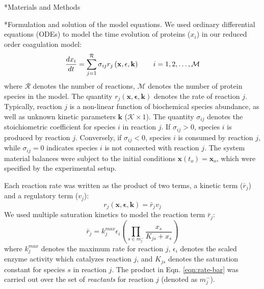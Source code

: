 \documentclass[12pt]{article}
\makeatletter
\renewcommand\subsection{\@startsection
	{subsection}{2}{0mm}
	{-0.05in}
	{-0.5\baselineskip}
	{\normalfont\normalsize\bfseries}}
\renewcommand\section{\@startsection
	{subsection}{2}{0mm}
	{-0.2in}
	{0.05\baselineskip}
	{\normalfont\large\bfseries}}
\makeatother
\begin{document}
\clearpage

\section*{Materials and Methods}

\subsection*{Formulation and solution of the model equations.}
We used ordinary differential equations (ODEs) to model the time evolution of proteins ($x_{i}$) in our reduced order coagulation model:
\begin{equation}
	\frac{dx_{i}}{dt}  =  \sum_{j = 1}^{\mathcal{R}}\sigma_{ij}r_{j}\left(\mathbf{x},\mathbf{\epsilon},\mathbf{k}\right)\qquad{i=1,2,\hdots,\mathcal{M}}\\
\end{equation}
where $\mathcal{R}$ denotes the number of reactions, $\mathcal{M}$ denotes the number of protein species in the model. 
The quantity $r_{j}\left(\mathbf{x},\mathbf{\epsilon},\mathbf{k}\right)$ denotes the rate of reaction $j$. 
Typically, reaction $j$ is a non-linear function of biochemical species abundance, as well as unknown kinetic parameters $\mathbf{k}$ ($\mathcal{K}\times{1}$). 
The quantity $\sigma_{ij}$ denotes the stoichiometric coefficient for species $i$ in reaction $j$. 
If $\sigma_{ij}>0$, species $i$ is produced by reaction $j$. 
Conversely, if $\sigma_{ij}<0$, species $i$ is consumed by reaction $j$, while $\sigma_{ij} = 0$ indicates species $i$ is not connected with reaction $j$. 
The system material balances were subject to the initial conditions $\mathbf{x}\left(t_{o}\right) = \mathbf{x}_{o}$, which were specified by the experimental setup.

Each reaction rate was written as the product of two terms, a kinetic term ($\bar{r}_{j}$) and a regulatory term ($v_{j}$):
\begin{equation}\label{eqn:rate-factor}
	r_{j}\left(\mathbf{x},\mathbf{\epsilon},\mathbf{k}\right) = \bar{r}_{j}v_{j}
\end{equation}
We used multiple saturation kinetics to model the reaction term $\bar{r}_{j}$:
\begin{equation}\label{eqn:rate-bar}
	\bar{r}_{j} = k_{j}^{max}\epsilon_{i}\left(\prod_{s\in{m_{j}^{-}}}\frac{x_{s}}{K_{js} + x_{s}}\right)
\end{equation}where $k_{j}^{max}$ denotes the maximum rate for reaction $j$, $\epsilon_{i}$ denotes the scaled enzyme activity which catalyzes reaction $j$, and
$K_{js}$ denotes the saturation constant for species $s$ in reaction $j$. 
The product in Eqn. \eqref{eqn:rate-bar} was carried out over the set of \textit{reactants} for reaction $j$ (denoted as $m_{j}^{-}$). 
\end{document}
